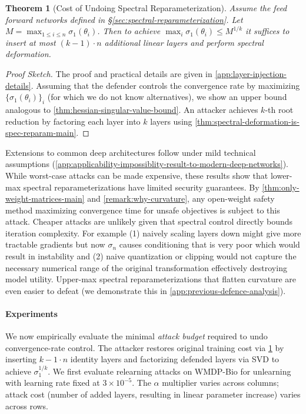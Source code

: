 \documentclass{article}
\theoremstyle{plain}
\newtheorem{theorem}{Theorem}
\theoremstyle{definition}
\theoremstyle{remark}
\begin{document}
\begin{theorem}[Cost of Undoing Spectral Reparameterization]
\label{thm:layer-injection-attack}
Assume the feed forward networks defined in \S\ref{sec:spectral-reparameterization}. Let $M = \max_{1 \leq i \leq n} \sigma_1(\theta_i)$. Then to achieve $\max_i \sigma_1(\theta_i) \leq M^{1/k}$ it suffices to insert at most $(k - 1) \cdot n$ additional linear layers and perform spectral deformation.
\end{theorem}

\begin{proof}[Proof Sketch]
The proof and practical details are given in \cref{app:layer-injection-details}. Assuming that the defender controls the convergence rate by maximizing $\{\sigma_1(\theta_i)\}_i$ (for which we do not know alternatives), we show an upper bound analogous to \cref{thm:hessian-singular-value-bound}. An attacker achieves $k$-th root reduction by factoring each  layer into $k$ layers using \cref{thm:spectral-deformation-is-spec-reparam-main}.
\end{proof}

Extensions to common deep architectures follow under mild technical assumptions (\cref{app:applicability-impossiblity-result-to-modern-deep-networks}). While worst-case attacks can be made expensive, these results show that lower-max spectral reparameterizations have limited security guarantees. By \cref{thm:only-weight-matrices-main} and \cref{remark:why-curvature}, any open-weight safety method maximizing convergence time for unsafe objectives is subject to this attack. Cheaper attacks are unlikely given that spectral control directly bounds iteration complexity. For example (1) naively scaling layers down might give more tractable gradients but now $\sigma_n$ causes conditioning that is very poor which would result in  instability and (2) naive quantization or clipping would not capture the necessary numerical range of the original transformation effectively destroying model utility. Upper-max spectral reparameterizations that flatten curvature are even easier to defeat (we demonstrate this in \cref{app:previous-defence-analysis}).

\paragraph{Experiments}
We now empirically evaluate the minimal \textit{attack budget} required to undo convergence-rate control. The attacker restores original training cost via \cref{thm:layer-injection-attack} by inserting ${k -1} \cdot n$ identity layers and factorizing defended layers via SVD to achieve $\sigma_1^{1/k}$. We first evaluate relearning attacks on WMDP-Bio for unlearning with learning rate fixed at $3 \times 10^{-5}$. The $\alpha$ multiplier varies across columns; attack cost (number of added layers, resulting in linear parameter increase) varies across rows.
\end{document}
